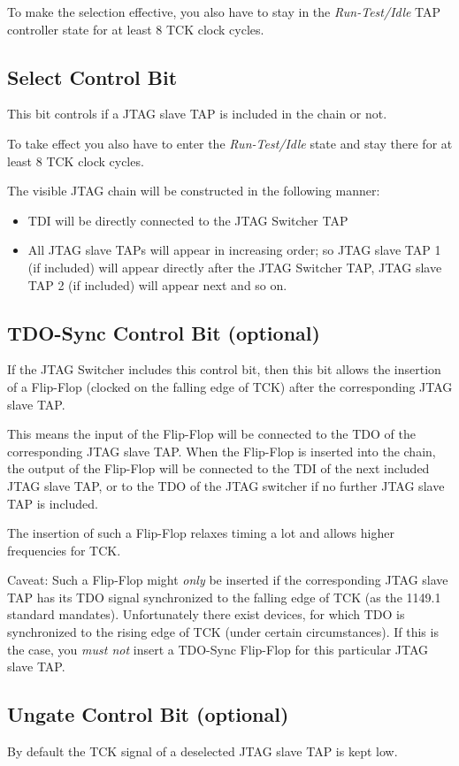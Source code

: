 \documentclass[10pt,english,a4paper]{report}
\begin{document}
To make the selection effective, you also have to stay in the {\em Run-Test/Idle} TAP controller state
for at least 8 TCK clock cycles.

\subsection{Select Control Bit}
This bit controls if a JTAG slave TAP is included in the chain or not.

To take effect you also have to enter the {\em Run-Test/Idle} state and
stay there for at least 8 TCK clock cycles.

The visible JTAG chain will be constructed in the following manner:
\begin{itemize}
\item TDI will be directly connected to the JTAG Switcher TAP
\item All JTAG slave TAPs will appear in increasing order;
so JTAG slave TAP 1 (if included) will appear directly after the JTAG Switcher TAP,
JTAG slave TAP 2 (if included) will appear next and so on.
\end{itemize}

\subsection{TDO-Sync Control Bit (optional)}
If the JTAG Switcher includes this control bit, then this bit allows the
insertion of a Flip-Flop (clocked on the falling edge of TCK) after the corresponding
JTAG slave TAP.

This means the input of the Flip-Flop will be connected to the TDO of the corresponding
JTAG slave TAP. When the Flip-Flop is inserted into the chain,
the output of the Flip-Flop will be connected to the TDI of the next included
JTAG slave TAP, or to the TDO of the JTAG switcher if no further JTAG slave TAP is included.

The insertion of such a Flip-Flop relaxes timing a lot and allows higher frequencies for TCK.

Caveat: Such a Flip-Flop might {\em only} be inserted if the corresponding JTAG slave TAP has
its TDO signal synchronized to the falling edge of TCK (as the 1149.1 standard mandates). Unfortunately
there exist devices, for which TDO is synchronized to the rising edge of TCK (under certain circumstances).
If this is the case, you {\em must not} insert a TDO-Sync Flip-Flop for this particular JTAG slave TAP.

\subsection{Ungate Control Bit (optional)}
By default the TCK signal of a deselected JTAG slave TAP is kept low.
\end{document}
